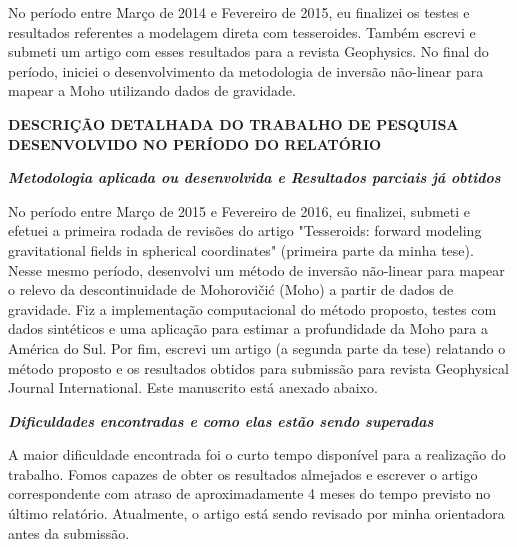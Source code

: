\documentclass[12pt,a4paper]{article}
\begin{document}
\vspace{1cm}

No período entre Março de 2014 e Fevereiro de 2015,
eu finalizei os testes e resultados referentes a modelagem direta com
tesseroides.
Também escrevi e submeti um artigo com esses resultados para a revista
Geophysics.
No final do período, iniciei o desenvolvimento da metodologia de inversão
não-linear para mapear a Moho utilizando dados de gravidade.


\vspace{3cm}


\begin{center}
\textbf{\large DESCRIÇÃO DETALHADA DO TRABALHO DE PESQUISA DESENVOLVIDO NO
PERÍODO DO RELATÓRIO}
\end{center}

\vspace{1cm}

{\centering\bfseries\itshape
Metodologia aplicada ou desenvolvida
e
Resultados parciais já obtidos
\par}

\bigskip

No período entre Março de 2015 e Fevereiro de 2016,
eu finalizei, submeti e efetuei a primeira rodada de revisões do artigo
"Tesseroids: forward modeling gravitational fields in spherical coordinates"
(primeira parte da minha tese).
Nesse mesmo período, desenvolvi um método de inversão não-linear para mapear o
relevo da descontinuidade de Mohorovičić (Moho) a partir de dados de gravidade.
Fiz a implementação computacional do método proposto, testes com dados
sintéticos e uma aplicação para estimar a profundidade da Moho para a
América do Sul.
Por fim, escrevi um artigo (a segunda parte da tese) relatando o método
proposto e os resultados obtidos para submissão para revista Geophysical
Journal International.
Este manuscrito está anexado abaixo.


\bigskip

{\centering\bfseries\itshape
Dificuldades encontradas e como elas estão sendo superadas
\par}

\bigskip

A maior dificuldade encontrada foi o curto tempo disponível para a realização
do trabalho. Fomos capazes de obter os resultados almejados e escrever o
artigo correspondente com atraso de aproximadamente 4 meses do tempo previsto
no último relatório.
Atualmente, o artigo está sendo revisado por minha orientadora antes da
submissão.
\end{document}

